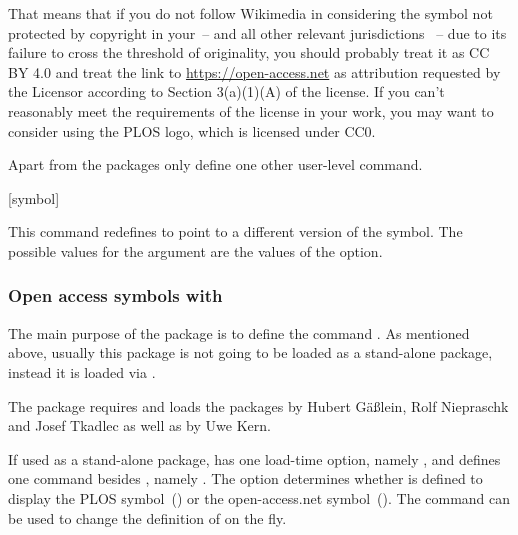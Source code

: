 \documentclass[DIV=9]{scrartcl}
\begin{document}
\begin{optionlist}
\begin{valuelist}
  That means that if you do not follow Wikimedia in considering the symbol
  not protected by copyright in your~-- and all other relevant jurisdictions%
  ~-- due to its failure to cross the threshold of originality,
  you should probably treat it as CC BY 4.0 and treat the link to
  \url{https://open-access.net} as attribution requested by the Licensor
  according to Section 3(a)(1)(A) of the license.
  If you can't reasonably meet the requirements of the license in your work,
  you may want to consider using the PLOS logo, which is licensed under CC0.
\end{valuelist}
\end{optionlist}

Apart from  the packages only define one other user-level
command.
\begin{ltxsyntax}
[symbol]

This command redefines  to point to a different version
of the symbol.
The possible values for the  argument are the values of the
 option.
\end{ltxsyntax}

\subsubsection[\sty{pict2e}]{Open access symbols with }
\label{sec:oa:symbol-pict2e}
\label{exltd@itm@biblatex-ext-oasymb-pict2e}
The main purpose of the package 
is to define the command .
As mentioned above, usually this package is not going to be loaded as a
stand-alone package, instead it is loaded via
.

The package requires and loads the packages
 by Hubert Gäßlein,
Rolf Nie\-praschk and Josef Tkadlec
as well as
 by Uwe Kern.

If used as a stand-alone package,  has one
load-time option, namely , and defines one command besides
, namely .
The option determines whether  is defined to display
the PLOS symbol~()
or the open-access.net symbol~().
The command  can be used to change the definition
of  on the fly.
\end{document}
